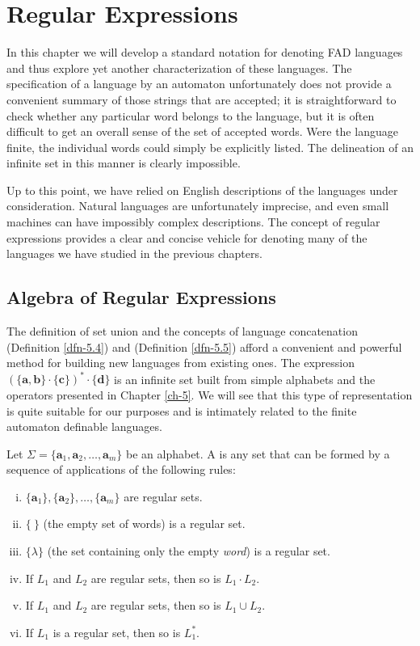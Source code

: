 \chapter{Regular Expressions}\label{ch-6}

In this chapter we will develop a standard notation for denoting FAD languages
and thus explore yet another characterization of these languages. The
specification of a language by an automaton unfortunately does not provide a
convenient summary of those strings that are accepted; it is straightforward to
check whether any particular word belongs to the language, but it is often
difficult to get an overall sense of the set of accepted words. Were the
language finite, the individual words could simply be explicitly listed. The
delineation of an infinite set in this manner is clearly impossible.

Up to this point, we have relied on English descriptions of the languages under
consideration. Natural languages are unfortunately imprecise, and even small
machines can have impossibly complex descriptions. The concept of regular
expressions provides a clear and concise vehicle for denoting many of the
languages we have studied in the previous chapters.

\section{Algebra of Regular Expressions}\label{sec-6.1}

The definition of set union and the concepts of language concatenation
(Definition \ref{dfn-5.4}) and  (Definition \ref{dfn-5.5}) afford a convenient and
powerful method for building new languages from existing ones. The expression
$(\{\pmb{a},\pmb{b}\}\cdot\{\pmb{c}\})^*\cdot\{\pmb{d}\}$ is an infinite set
built from simple alphabets and the operators presented in Chapter \ref{ch-5}. We will
see that this type of representation is quite suitable for our purposes and is
intimately related to the finite automaton definable languages.

\begin{dfn}\label{dfn-6.1}
Let $\Sigma =\{\pmb{a}_1,\pmb{a}_2, \ldots ,\pmb{a}_m\}$ be an alphabet. A
\emph{} is any set that can be formed by a
sequence of applications of the following rules:
\begin{enumerate}[i.]
\item $\{\pmb{a}_1\},\{\pmb{a}_2\}, \ldots ,\{\pmb{a}_m\}$ are regular sets.
\item $\{\ \}$ (the empty set of words) is a regular set.
\item $\{\lambda\}$ (the set containing only the empty \emph{word}) is a regular set.
\item If $L_1$ and $L_2$ are regular sets, then so is $L_1 \cdot L_2$.
\item If $L_1$ and $L_2$ are regular sets, then so is $L_1 \cup L_2$.
\item If $L_1$ is a regular set, then so is $L_1^*$.
\end{enumerate}
\end{dfn}
